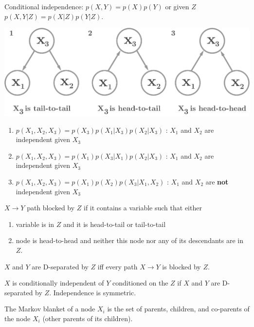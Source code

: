Conditional independence: $p(X,Y)=p(X)p(Y)$ or given $Z$ $p(X,Y|Z)=p(X|Z)p(Y|Z)$.

\includegraphics[width=\linewidth]{figs/bayes.png}

\begin{enumerate}
\item $p(X_1, X_2, X_3) = p(X_3)p(X_1|X_3)p(X_2|X_3)$ : $X_1$ and $X_2$ are independent given $X_3$
\item $p(X_1, X_2, X_3) = p(X_1)p(X_3|X_1)p(X_2|X_3)$ : $X_1$ and $X_2$ are independent given $X_3$
\item $p(X_1, X_2, X_3) = p(X_1)p(X_2)p(X_3|X_1, X_2)$ : $X_1$ and $X_2$ are \textbf{not} independent given $X_3$
\end{enumerate}

$X \rightarrow Y$ path blocked by $Z$ if it contains a variable such that either
\begin{enumerate}
\item variable is in $Z$ and it is head-to-tail or tail-to-tail
\item node is head-to-head and neither this node nor any of its descendants are in $Z$.
\end{enumerate}

$X$ and $Y$ are D-separated by $Z$ iff every path $X \rightarrow Y$ is blocked by $Z$.

$X$ is conditionally independent of $Y$ conditioned on the $Z$ if $X$ and $Y$ are D-separated by $Z$. Independence is symmetric.

The Markov blanket of a node $X_i$ is the set of parents, children, and co-parents of the node $X_i$ (other parents of its children).
